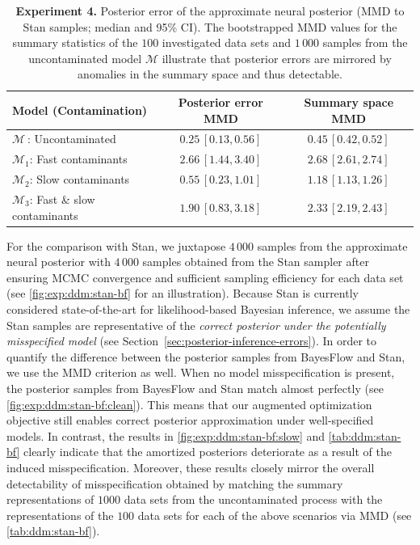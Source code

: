 \documentclass[twoside,11pt]{article}
\newcommand{\numberDDM}{4}
\newcommand{\0}{\boldsymbol{0}}
\newcommand{\M}{\mathcal{M}}
\begin{document}
\begin{table}[b]
    \centering
    \renewcommand{\arraystretch}{1.2}
    \begin{tabular}{l|c|c}
        \textbf{Model (Contamination)} & \textbf{Posterior error MMD} & \textbf{Summary space MMD}\\
        \hline
        $\M_{\ }$: Uncontaminated                  & $0.25\,[0.13, 0.56]$    & $0.45\,[0.42, 0.52]$ \\
        $\M_{1}$: Fast contaminants               & $2.66\,[1.44, 3.40]$    & $2.68\,[2.61, 2.74]$ \\
        $\M_{2}$: Slow contaminants               & $0.55\,[0.23, 1.01]$    & $1.18\,[1.13, 1.26]$ \\
        $\M_{3}$: Fast \& slow contaminants      & $1.90\,[0.83, 3.18]$    & $2.33\,[2.19, 2.43]$
    \end{tabular}
    \caption{
    \textbf{Experiment \numberDDM.} Posterior error of the approximate neural posterior (MMD to Stan samples; median and 95\% CI).
    The bootstrapped MMD values for the summary statistics of the $100$ investigated data sets and $1\,000$ samples from the uncontaminated model $\M$
    illustrate that posterior errors are mirrored by anomalies in the summary space and thus detectable.
    }
    \label{tab:ddm:stan-bf}
\end{table}

For the comparison with Stan, we juxtapose $4\,000$ samples from the approximate neural posterior with $4\,000$ samples obtained from the Stan sampler after ensuring MCMC convergence and sufficient sampling efficiency for each data set (see \autoref{fig:exp:ddm:stan-bf} for an illustration). 
Because Stan is currently considered state-of-the-art for likelihood-based Bayesian inference, we assume the Stan samples are representative of the \emph{correct posterior under the potentially misspecified model} (see Section~\ref{sec:posterior-inference-errors}).
In order to quantify the difference between the posterior samples from BayesFlow and Stan, we use the MMD criterion as well.
When no model misspecification is present, the posterior samples from BayesFlow and Stan match almost perfectly (see \autoref{fig:exp:ddm:stan-bf:clean}).
This means that our augmented optimization objective still enables correct posterior approximation under well-specified models.
In contrast, the results in \autoref{fig:exp:ddm:stan-bf:slow} and \autoref{tab:ddm:stan-bf} clearly indicate that the amortized posteriors deteriorate as a result of the induced misspecification.
Moreover, these results closely mirror the overall detectability of misspecification obtained by matching the summary representations of $1000$ data sets from the uncontaminated process with the representations of the $100$ data sets for each of the above scenarios via MMD (see \autoref{tab:ddm:stan-bf}).
\end{document}
